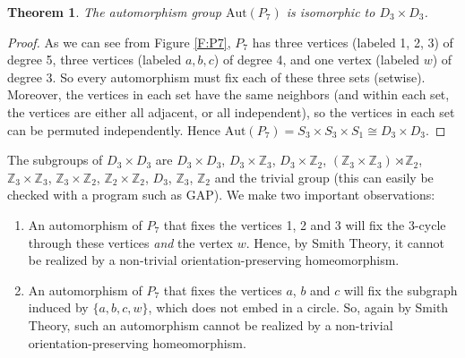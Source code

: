 \documentclass[11]{amsart}
\def\Z{\mathbb{Z}}
\def\Aut{{\mathrm{Aut}}}
\newtheorem{theorem}{Theorem}[section]
\theoremstyle{definition}
\theoremstyle{remark}
\begin{document}
\begin{theorem}\label{T:P7aut}
The automorphism group $\Aut(P_7)$ is isomorphic to $D_3 \times D_3$.
\end{theorem}
\begin{proof}
As we can see from Figure \ref{F:P7}, $P_7$ has three vertices (labeled 1, 2, 3) of degree 5, three vertices (labeled $a, b, c$) of degree 4, and one vertex (labeled $w$) of degree 3. So every automorphism must fix each of these three sets (setwise). Moreover, the vertices in each set have the same neighbors (and within each set, the vertices are either all adjacent, or all independent), so the vertices in each set can be permuted independently.  Hence $\Aut(P_7) = S_3 \times S_3 \times S_1 \cong D_3 \times D_3$.
\end{proof}

The subgroups of $D_3 \times D_3$ are $D_3 \times D_3$, $D_3 \times \Z_3$, $D_3 \times \Z_2$, $(\Z_3 \times \Z_3) \rtimes \Z_2$, $\Z_3 \times \Z_3$, $\Z_3 \times \Z_2$, $\Z_2 \times \Z_2$, $D_3$, $\Z_3$, $\Z_2$ and the trivial group (this can easily be checked with a program such as GAP). We make two important observations: \begin{enumerate}
	\item An automorphism of $P_7$ that fixes the vertices 1, 2 and 3 will fix the 3-cycle through these vertices {\em and} the vertex $w$.  Hence, by Smith Theory, it cannot be realized by a non-trivial orientation-preserving homeomorphism.
	\item An automorphism of $P_7$ that fixes the vertices $a$, $b$ and $c$ will fix the subgraph induced by $\{a, b, c, w\}$, which does not embed in a circle.  So, again by Smith Theory, such an automorphism cannot be realized by a non-trivial orientation-preserving homeomorphism.
\end{enumerate}
\end{document}
